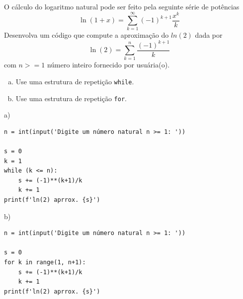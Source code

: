 \begin{exer}
  O cálculo do logaritmo natural pode ser feito pela seguinte série de potências
  \begin{equation}
    \ln(1 + x) = \sum_{k=1}^\infty (-1)^{k+1}\frac{x^k}{k}
  \end{equation}
  Desenvolva um código que compute a aproximação do $ln(2)$ dada por
  \begin{equation}
    \ln(2) = \sum_{k=1}^n \frac{(-1)^{k+1}}{k}
  \end{equation}
  com $n >= 1$ número inteiro fornecido por usuária(o).
  \begin{enumerate}[a)]
  \item Use uma estrutura de repetição \verb+while+.
  \item Use uma estrutura de repetição \verb+for+.
  \end{enumerate}
\end{exer}
\begin{resp}
  a)

\begin{lstlisting}
n = int(input('Digite um número natural n >= 1: '))

s = 0
k = 1
while (k <= n):
    s += (-1)**(k+1)/k
    k += 1
print(f'ln(2) aprrox. {s}')
\end{lstlisting}

b)

\begin{lstlisting}
n = int(input('Digite um número natural n >= 1: '))

s = 0
for k in range(1, n+1):
    s += (-1)**(k+1)/k
    k += 1
print(f'ln(2) aprrox. {s}')
\end{lstlisting}

\end{resp}


